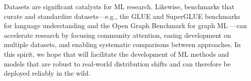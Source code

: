 Datasets are significant catalysts for ML research.
Likewise, benchmarks that curate and standardize datasets---e.g., the GLUE and SuperGLUE benchmarks for language understanding \citep{wang2019superglue,wang2019glue} and the Open Graph Benchmark for graph ML \citep{hu2020open}---can accelerate research by focusing community attention, easing development on multiple datasets, and enabling systematic comparisons between approaches.
In this spirit, we hope that \Wilds will facilitate the development of ML methods and models that are robust to real-world distribution shifts and can therefore be deployed reliably in the wild.
